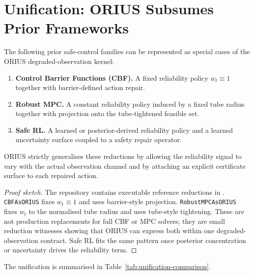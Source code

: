 \section{Unification: ORIUS Subsumes Prior Frameworks}
\label{sec:unification}

\begin{theorem}[Unification]
\label{thm:unification}
The following prior safe-control families can be represented as special cases
of the ORIUS degraded-observation kernel:
\begin{enumerate}
  \item \textbf{Control Barrier Functions (CBF).} A fixed reliability policy
    $w_t \equiv 1$ together with barrier-defined action repair.
  \item \textbf{Robust MPC.} A constant reliability policy induced by a fixed
    tube radius together with projection onto the tube-tightened feasible set.
  \item \textbf{Safe RL.} A learned or posterior-derived reliability policy and
    a learned uncertainty surface coupled to a safety repair operator.
\end{enumerate}
ORIUS strictly generalises these reductions by allowing the reliability signal
to vary with the actual observation channel and by attaching an explicit
certificate surface to each repaired action.
\end{theorem}

\begin{proof}[Proof sketch]
The repository contains executable reference reductions in
.  \texttt{CBFAsORIUS} fixes
$w_t \equiv 1$ and uses barrier-style projection.  \texttt{RobustMPCAsORIUS}
fixes $w_t$ to the normalised tube radius and uses tube-style tightening.
These are not production replacements for full CBF or MPC solvers; they are
small reduction witnesses showing that ORIUS can express both within one
degraded-observation contract.  Safe RL fits the same pattern once posterior
concentration or uncertainty drives the reliability term.
\end{proof}

The unification is summarised in Table~\ref{tab:unification-comparison}.

